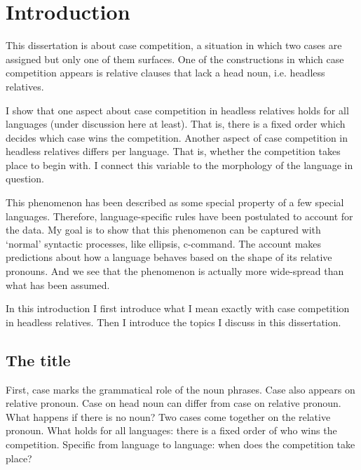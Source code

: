 
\chapter{Introduction}

This dissertation is about case competition, a situation in which two cases are assigned but only one of them surfaces. One of the constructions in which case competition appears is relative clauses that lack a head noun, i.e. headless relatives.

I show that one aspect about case competition in headless relatives holds for all languages (under discussion here at least). That is, there is a fixed order which decides which case wins the competition. Another aspect of case competition in headless relatives differs per language. That is, whether the competition takes place to begin with. I connect this variable to the morphology of the language in question.

This phenomenon has been described as some special property of a few special languages. Therefore, language-specific rules have been postulated to account for the data. My goal is to show that this phenomenon can be captured with `normal' syntactic processes, like ellipsis, c-command. The account makes predictions about how a language behaves based on the shape of its relative pronouns. And we see that the phenomenon is actually more wide-spread than what has been assumed.

In this introduction I first introduce what I mean exactly with case competition in headless relatives. Then I introduce the topics I discuss in this dissertation.


\section{The title}

First, case marks the grammatical role of the noun phrases. Case also appears on relative pronoun. Case on head noun can differ from case on relative pronoun. What happens if there is no noun? Two cases come together on the relative pronoun. What holds for all languages: there is a fixed order of who wins the competition. Specific from language to language: when does the competition take place?

